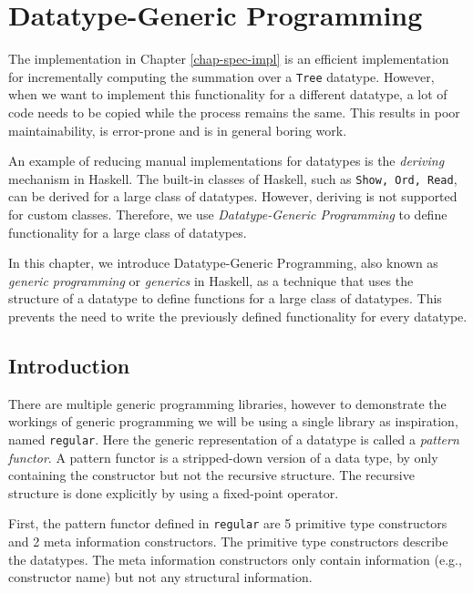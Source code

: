 \chapter{Datatype-Generic Programming}
\label{chap-dat-gen-program}


The implementation in Chapter \ref{chap-spec-impl} is an efficient implementation for incrementally computing the summation over a \texttt{Tree} datatype. However, when we want to implement this functionality for a different datatype, a lot of code needs to be copied while the process remains the same. This results in poor maintainability, is error-prone and is in general boring work.

An example of reducing manual implementations for datatypes is the \textit{deriving} mechanism in Haskell. The built-in classes of Haskell, such as \texttt{Show, Ord, Read}, can be derived for a large class of datatypes. However, deriving is not supported for custom classes. Therefore, we use \textit{Datatype-Generic Programming}\cite*{gibbons2006datatype} to define functionality for a large class of datatypes.

In this chapter, we introduce Datatype-Generic Programming, also known as \textit{generic programming} or \textit{generics} in Haskell, as a technique that uses the structure of a datatype to define functions for a large class of datatypes. This prevents the need to write the previously defined functionality for every datatype.

\section{Introduction}
There are multiple generic programming libraries, however to demonstrate the workings of generic programming we will be using a single library as inspiration, named \texttt{regular}\cite*{regular2022}. Here the generic representation of a datatype is called a \textit{pattern functor}. A pattern functor is a stripped-down version of a data type, by only containing the constructor but not the recursive structure. The recursive structure is done explicitly by using a fixed-point operator. 

First, the pattern functor defined in \texttt{regular} are 5 primitive type constructors and 2 meta information constructors. The primitive type constructors describe the datatypes. The meta information constructors only contain information (e.g., constructor name) but not any structural information.


